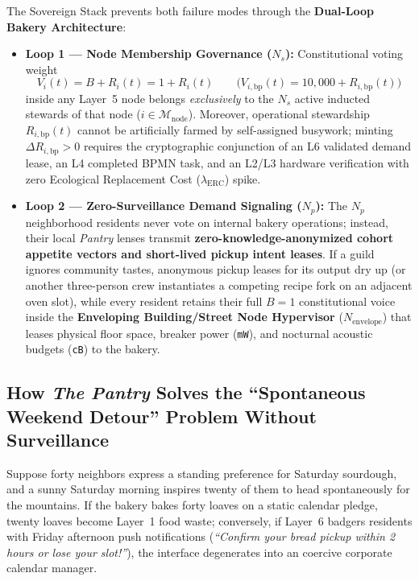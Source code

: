 The Sovereign Stack prevents both failure modes through the \textbf{Dual-Loop Bakery Architecture}:
\begin{itemize}
    \item \textbf{Loop 1 --- Node Membership Governance ($N_s$):} Constitutional voting weight
    \begin{equation}
        V_i(t) = B + R_i(t) = 1 + R_i(t) \qquad \bigl(V_{i,\mathrm{bp}}(t) = 10{,}000 + R_{i,\mathrm{bp}}(t)\bigr)
        \label{eq:ch3-unified-voting-weight}
    \end{equation}
    inside any Layer~5 node belongs \emph{exclusively} to the $N_s$ active inducted stewards of that node ($i \in \mathcal{M}_{\mathrm{node}}$). Moreover, operational stewardship $R_{i,\mathrm{bp}}(t)$ cannot be artificially farmed by self-assigned busywork; minting $\Delta R_{i,\mathrm{bp}} > 0$ requires the cryptographic conjunction of an L6 validated demand lease, an L4 completed BPMN task, and an L2/L3 hardware verification with zero Ecological Replacement Cost ($\lambda_{\mathrm{ERC}}$) spike.
    \item \textbf{Loop 2 --- Zero-Surveillance Demand Signaling ($N_p$):} The $N_p$ neighborhood residents never vote on internal bakery operations; instead, their local \textit{Pantry} lenses transmit \textbf{zero-knowledge-anonymized cohort appetite vectors and short-lived pickup intent leases}. If a guild ignores community tastes, anonymous pickup leases for its output dry up (or another three-person crew instantiates a competing recipe fork on an adjacent oven slot), while every resident retains their full $B = 1$ constitutional voice inside the \textbf{Enveloping Building/Street Node Hypervisor} ($N_{\mathrm{envelope}}$) that leases physical floor space, breaker power (\texttt{mW}), and nocturnal acoustic budgets (\texttt{cB}) to the bakery.
\end{itemize}

\subsection{How \textit{The Pantry} Solves the ``Spontaneous Weekend Detour'' Problem Without Surveillance}

Suppose forty neighbors express a standing preference for Saturday sourdough, and a sunny Saturday morning inspires twenty of them to head spontaneously for the mountains. If the bakery bakes forty loaves on a static calendar pledge, twenty loaves become Layer~1 food waste; conversely, if Layer~6 badgers residents with Friday afternoon push notifications (\emph{``Confirm your bread pickup within 2 hours or lose your slot!''}), the interface degenerates into an coercive corporate calendar manager.

